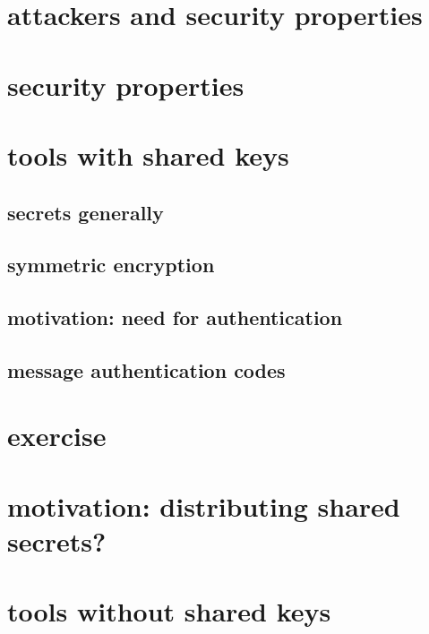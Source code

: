 
\section{attackers and security properties}


\section{security properties}


\section{tools with shared keys}

\subsection{secrets generally}


\subsection{symmetric encryption}


\subsection{motivation: need for authentication}


\subsection{message authentication codes}


\section{exercise}


\section{motivation: distributing shared secrets?}


\section{tools without shared keys}

